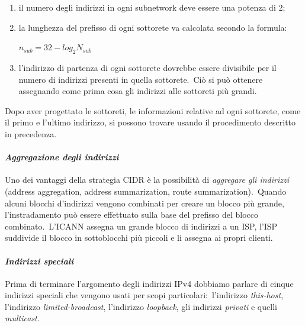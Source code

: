 \begin{enumerate}
    \item il numero degli indirizzi in ogni subnetwork deve essere una potenza di 2;
    \item la lunghezza del prefisso di ogni sottorete va calcolata secondo la formula:
          \begin{center}
              $n_{sub} = 32 - log_2N_{sub}$
          \end{center}
    \item l'indirizzo di partenza di ogni sottorete dovrebbe essere divisibile per il numero di indirizzi presenti in quella sottorete.\
          Ciò si può ottenere assegnando come prima cosa gli indirizzi alle sottoreti più grandi.
\end{enumerate}

Dopo aver progettato le sottoreti, le informazioni relative ad ogni sottorete, come il primo e l'ultimo indirizzo, si possono trovare usando il procedimento descritto in precedenza.

\paragraph{\emph{Aggregazione degli indirizzi}}

Uno dei vantaggi della strategia CIDR è la possibilità di \emph{aggregare gli indirizzi} (address aggregation, address summarization, route summarization).\
Quando alcuni blocchi d'indirizzi vengono combinati per creare un blocco più grande, l'instradamento può essere effettuato sulla base del prefisso del blocco combinato.\
L'ICANN assegna un grande blocco di indirizzi a un ISP, l'ISP suddivide il blocco in sottoblocchi più piccoli e li assegna ai propri clienti.

\paragraph{\emph{Indirizzi speciali}}

Prima di terminare l'argomento degli indirizzi IPv4 dobbiamo parlare di cinque indirizzi speciali che vengono usati per scopi particolari:\ l'indirizzo \emph{this-host}, l'indirizzo \emph{limited-broadcast}, l'indirizzo \emph{loopback}, gli indirizzi \emph{privati} e quelli \emph{multicast}.

